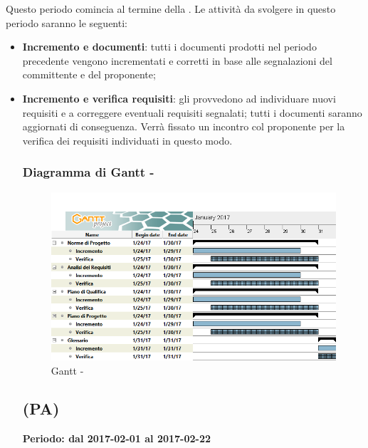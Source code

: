 \documentclass[./PianoDiProgetto.tex]{subfiles}
\begin{document}
  Questo periodo comincia al termine della \PerAR.  Le attività da svolgere in questo periodo saranno le seguenti:
  \begin{itemize}
    \item \textbf{Incremento e  documenti}: tutti i documenti prodotti nel periodo precedente vengono incrementati e corretti in base alle segnalazioni del committente e del proponente;
    \item \textbf{Incremento e verifica requisiti}:  gli \ANP{} provvedono ad individuare nuovi requisiti e a correggere eventuali requisiti segnalati; tutti i documenti saranno aggiornati di conseguenza. Verrà fissato un incontro col proponente per la verifica dei requisiti individuati in questo modo.
    
    \clearpage
  \subsubsection{Diagramma di Gantt - \PerAD}
    \begin{figure}[!h]
    \centering
    \includegraphics[width=\textwidth]{images/AD}
    \caption{Gantt - \PerAD}
    \end{figure}

  \subsection{\PerPA{} (PA)}
  \textbf{Periodo: dal 2017-02-01 al 2017-02-22}


\end{itemize}
\end{document}
